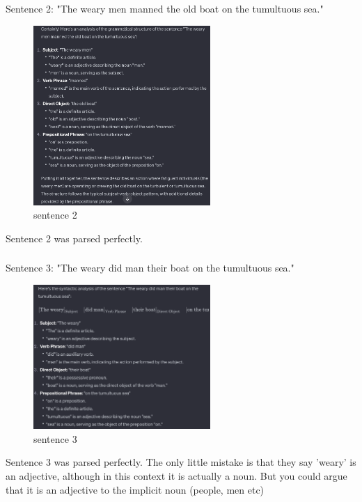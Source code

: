 \documentclass{article}
\begin{document}
\subsubsection{}	%
Sentence 2: "The weary men manned the old boat on the tumultuous sea." \\
\begin{figure}[H]
  \centering
  \includegraphics[width=0.6\textwidth]{4.1a2.png} 
  \caption{sentence 2}
\end{figure}


Sentence 2 was parsed perfectly. \\
\subsubsection{}	%
Sentence 3: "The weary did man their boat on the tumultuous sea." \\
\begin{figure}[H]
  \centering
  \includegraphics[width=0.6\textwidth]{4.1a5.png} 
  \caption{sentence 3}
\end{figure}


Sentence 3 was parsed perfectly. The only little mistake is that they say 'weary' is an adjective, although in this context it is actually a noun. But you could argue that it is an adjective to the implicit noun (people, men etc) \\
\end{document}
